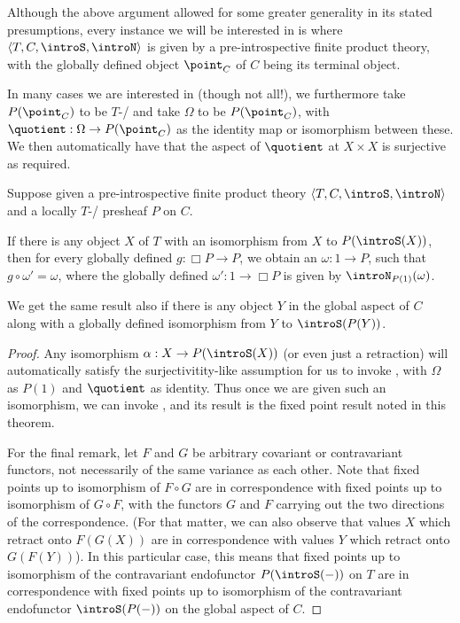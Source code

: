 \begin{corollary}\label{PreIntrospDiagSpecialization}
Although the above argument allowed for some greater generality in its stated presumptions, every instance we will be interested in is where $\langle T, C, \introS, \introN \rangle$ is given by a pre-introspective finite product theory, with the globally defined object $\point_C$ of $C$ being its terminal object.

In many cases we are interested in (though not all!), we furthermore take $P(\point_C)$ to be $T$-\repsmall/ and take $\Omega$ to be $P(\point_C)$, with $\quotient : \Omega \to P(\point_C)$ as the identity map or isomorphism between these. We then automatically have that the aspect of $\quotient$ at ${X \times X}$ is surjective as required.
\end{corollary}

\begin{theorem}\label{PreIntrospDiagFromIso}
Suppose given a pre-introspective finite product theory $\langle T, C, \introS, \introN \rangle$ and a locally $T$-\repsmall/ presheaf $P$  on $C$.

If there is any object $X$ of $T$ with an isomorphism from $X$ to $P(\introS(X))$, then for every globally defined $g : \Box P \to P$, we obtain an $\omega : 1 \to P$, such that $g \circ \omega' = \omega$, where the globally defined $\omega' : 1 \to \Box P$ is given by $\introN_{P(1)}(\omega)$. 

We get the same result also if there is any object $Y$ in the global aspect of $C$ along with a globally defined isomorphism from $Y$ to $\introS(P(Y))$.
\end{theorem}
\begin{proof}
Any isomorphism $\alpha : X \to P(\introS(X))$ (or even just a retraction) will automatically satisfy the surjectivitity-like assumption for us to invoke , with $\Omega$ as $P(1)$ and $\quotient$ as identity. Thus once we are given such an isomorphism, we can invoke , and its result is the fixed point result noted in this theorem.

For the final remark, let $F$ and $G$ be arbitrary covariant or contravariant functors, not necessarily of the same variance as each other. Note that fixed points up to isomorphism of $F \circ G$ are in correspondence with fixed points up to isomorphism of $G \circ F$, with the functors $G$ and $F$ carrying out the two directions of the correspondence. (For that matter, we can also observe that values $X$ which retract onto $F(G(X))$ are in correspondence with values $Y$ which retract onto $G(F(Y))$). In this particular case, this means that fixed points up to isomorphism of the contravariant endofunctor $P(\introS(-))$ on $T$ are in correspondence with fixed points up to isomorphism of the contravariant endofunctor $\introS(P(-))$ on the global aspect of $C$.
\end{proof}

